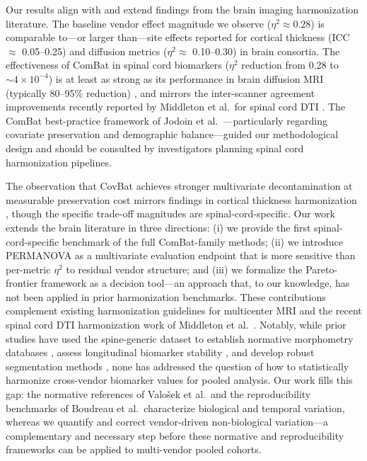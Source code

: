 \documentclass[12pt,a4paper]{article}
\begin{document}
Our results align with and extend findings from the brain imaging harmonization literature. The baseline vendor effect magnitude we observe ($\eta^2 \approx 0.28$) is comparable to---or larger than---site effects reported for cortical thickness (ICC $\approx$ 0.05--0.25) \cite{fortin2018harmonization} and diffusion metrics ($\eta^2 \approx$ 0.10--0.30) \cite{tax2019cross} in brain consortia. The effectiveness of ComBat in spinal cord biomarkers ($\eta^2$ reduction from 0.28 to $\sim 4 \times 10^{-4}$) is at least as strong as its performance in brain diffusion MRI (typically 80--95\% reduction) \cite{fortin2017harmonization,fortin2018harmonization}, and mirrors the inter-scanner agreement improvements recently reported by Middleton et al.\ for spinal cord DTI \cite{middleton2023spinal}. The ComBat best-practice framework of Jodoin et al.\ \cite{jodoin2025combat}---particularly regarding covariate preservation and demographic balance---guided our methodological design and should be consulted by investigators planning spinal cord harmonization pipelines.

The observation that CovBat achieves stronger multivariate decontamination at measurable preservation cost mirrors findings in cortical thickness harmonization \cite{chen2022mitigating}, though the specific trade-off magnitudes are spinal-cord-specific. Our work extends the brain literature in three directions: (i) we provide the first spinal-cord-specific benchmark of the full ComBat-family methods; (ii) we introduce PERMANOVA as a multivariate evaluation endpoint that is more sensitive than per-metric $\eta^2$ to residual vendor structure; and (iii) we formalize the Pareto-frontier framework as a decision tool---an approach that, to our knowledge, has not been applied in prior harmonization benchmarks. These contributions complement existing harmonization guidelines for multicenter MRI \cite{destefano2022magnims} and the recent spinal cord DTI harmonization work of Middleton et al.\ \cite{middleton2023spinal}. Notably, while prior studies have used the spine-generic dataset to establish normative morphometry databases \cite{valosek2024morphometry}, assess longitudinal biomarker stability \cite{boudreau2025longitudinal}, and develop robust segmentation methods \cite{bedard2025contrast}, none has addressed the question of how to statistically harmonize cross-vendor biomarker values for pooled analysis. Our work fills this gap: the normative references of Valo\v{s}ek et al.\ and the reproducibility benchmarks of Boudreau et al.\ characterize biological and temporal variation, whereas we quantify and correct vendor-driven non-biological variation---a complementary and necessary step before these normative and reproducibility frameworks can be applied to multi-vendor pooled cohorts.
\end{document}
